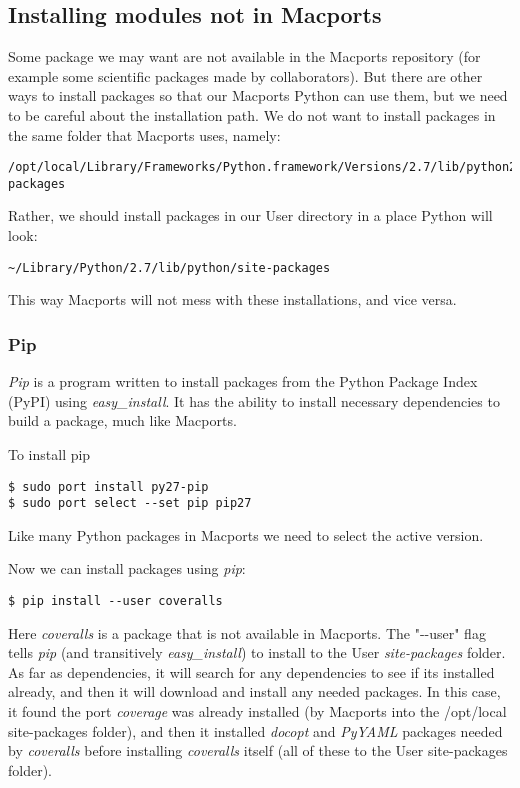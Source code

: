 \documentclass[11pt]{article}
\begin{document}
\subsection{Installing modules not in Macports}
Some package we may want are not available in the Macports repository (for example some scientific packages made by collaborators). But there are other ways to install packages so that our Macports Python can use them, but we need to be careful about the installation path. We do not want to install packages in the same folder that Macports uses, namely:
\begin{lstlisting}[style=Bash]
/opt/local/Library/Frameworks/Python.framework/Versions/2.7/lib/python2.7/site-packages
\end{lstlisting}
Rather, we should install packages in our User directory in a place Python will look:
\begin{lstlisting}[style=Bash]
~/Library/Python/2.7/lib/python/site-packages
\end{lstlisting}
This way Macports will not mess with these installations, and vice versa. 



\subsubsection{Pip}
{\it Pip} is a program written to install packages from the Python Package Index (PyPI) using {\it easy\_install}. It has the ability to install necessary dependencies to build a package, much like Macports. 

To install pip
\begin{lstlisting}[style=Bash]
$ sudo port install py27-pip
$ sudo port select --set pip pip27
\end{lstlisting}
Like many Python packages in Macports we need to select the active version.

Now we can install packages using {\it pip}:
\begin{lstlisting}[style=Bash]
$ pip install --user coveralls
\end{lstlisting}
Here {\it coveralls} is a package that is not available in Macports. The "-{}-user" flag tells {\it pip} (and transitively {\it easy\_install}) to install to the User {\it site-packages} folder. As far as dependencies, it will search for any dependencies to see if its installed already, and then it will download and install any needed packages. In this case, it found the port {\it coverage} was already installed (by Macports into the /opt/local site-packages folder), and then it installed {\it docopt} and {\it PyYAML} packages needed by {\it coveralls} before installing {\it coveralls} itself (all of these to the User site-packages folder).
\end{document}
